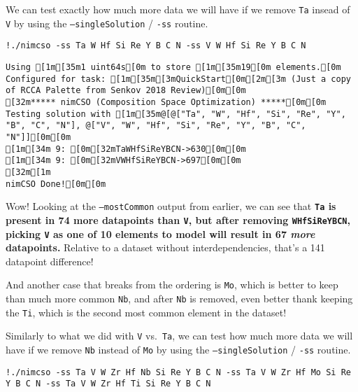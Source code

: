 We can test exactly how much more data we will have if we remove
\texttt{Ta} insead of \texttt{V} by
using the \texttt{--singleSolution} /
\texttt{-ss} routine.

\begin{verbatim}
!./nimcso -ss Ta W Hf Si Re Y B C N -ss V W Hf Si Re Y B C N
\end{verbatim}

\begin{verbatim}
Using [1m[35m1 uint64s[0m to store [1m[35m19[0m elements.[0m
Configured for task: [1m[35m[3mQuickStart[0m[2m[3m (Just a copy of RCCA Palette from Senkov 2018 Review)[0m[0m
[32m***** nimCSO (Composition Space Optimization) *****[0m[0m
Testing solution with [1m[35m@[@["Ta", "W", "Hf", "Si", "Re", "Y", "B", "C", "N"], @["V", "W", "Hf", "Si", "Re", "Y", "B", "C", "N"]][0m[0m
[1m[34m 9: [0m[32mTaWHfSiReYBCN->630[0m[0m
[1m[34m 9: [0m[32mVWHfSiReYBCN->697[0m[0m
[32m[1m
nimCSO Done![0m[0m
\end{verbatim}

Wow! Looking at the \texttt{--mostCommon} output from
earlier, we can see that \textbf{\texttt{Ta} is present
in 74 more datapoints than \texttt{V}, but after
removing \texttt{WHfSiReYBCN}, picking
\texttt{V} as one of 10 elements to model will result
in 67 \emph{more} datapoints.} Relative to a dataset without
interdependencies, that's a 141 datapoint difference!

And another case that breaks from the ordering is
\texttt{Mo}, which is better to keep than much more
common \texttt{Nb}, and after
\texttt{Nb} is removed, even better thank keeping the
\texttt{Ti}, which is the second most common element in
the dataset!

Similarly to what we did with \texttt{V}
vs.~\texttt{Ta}, we can test how much more data we will
have if we remove \texttt{Nb} instead of
\texttt{Mo} by using the
\texttt{--singleSolution} /
\texttt{-ss} routine.

\begin{verbatim}
!./nimcso -ss Ta V W Zr Hf Nb Si Re Y B C N -ss Ta V W Zr Hf Mo Si Re Y B C N -ss Ta V W Zr Hf Ti Si Re Y B C N
\end{verbatim}

